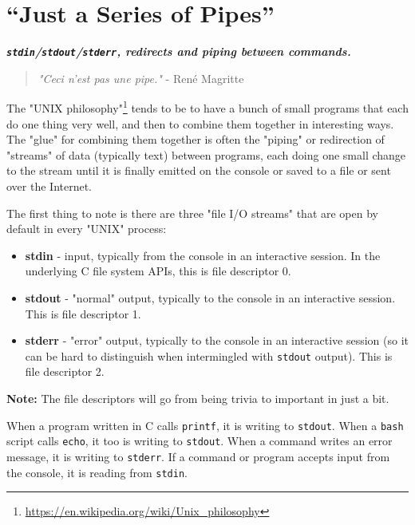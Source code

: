 \documentclass[10pt,american,]{book}
\makeatletter
\renewcommand{\href}[2]{#2\footnote{\url{#1}}}
\numberwithin{figure}{chapter}
\DeclareRobustCommand{\drcmd}[1]{\index{Commands!#1@\texttt{#1}}}
\makeatother
\begin{document}
\hypertarget{just-a-series-of-pipes}{\chapter{“Just a Series of
Pipes”}\label{just-a-series-of-pipes}}

\textbf{\emph{\texttt{stdin}/\texttt{stdout}/\texttt{stderr}, redirects
and piping between commands.}}

\begin{quote}
\emph{"Ceci n'est pas une pipe."} - René Magritte
\end{quote}

The \href{https://en.wikipedia.org/wiki/Unix_philosophy}{"UNIX
philosophy"} tends to be to have a bunch of small programs that each do
one thing very well, and then to combine them together in interesting
ways. The "glue" for combining them together is often the "piping" or
redirection of "streams" of data (typically text) between programs, each
doing one small change to the stream until it is finally emitted on the
console or saved to a file or sent over the Internet.

The first thing to note is there are three "file I/O streams" that are
open by default in every "UNIX" process:

\begin{itemize}
\item
  \textbf{stdin} - input, typically from the console in an
  interactive session. In the underlying C file system APIs, this is
  file descriptor 0.
\item
  \textbf{stdout} - "normal" output, typically to the
  console in an interactive session. This is file descriptor 1.
\item
  \textbf{stderr} - "error" output, typically to the
  console in an interactive session (so it can be hard to distinguish
  when intermingled with \texttt{stdout} output). This is file
  descriptor 2.
\end{itemize}

\textbf{Note:} The file descriptors will go from being trivia to
important in just a bit.

When a program written in C calls \texttt{printf}, it is writing to
\texttt{stdout}. When a \texttt{bash} script calls
\texttt{echo}\drcmd{echo}, it too is writing to \texttt{stdout}. When a
command writes an error message, it is writing to \texttt{stderr}. If a
command or program accepts input from the console, it is reading from
\texttt{stdin}.
\end{document}
